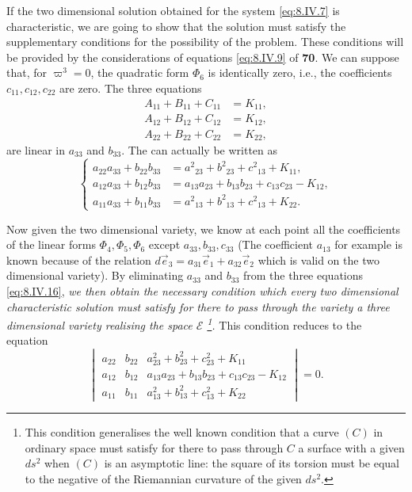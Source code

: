 \documentclass[leqno,11pt]{book}
\numberwithin{equation}{chapter}
\theoremstyle{shape1}
\theoremstyle{shape0}
\theoremstyle{shape2}
\theoremstyle{definition}
\begin{document}
If the two dimensional solution obtained for the system \eqref{eq:8.IV.7} is characteristic, we are going to show that the solution must satisfy the supplementary conditions for the possibility of the problem. These conditions will be provided by the considerations of equations \eqref{eq:8.IV.9} of \textsection\textbf{70}. We can suppose that, for $\varpi^{3}=0$, the quadratic form $\Phi_{6}$ is identically zero, i.e., the coefficients $c_{11},c_{12},c_{22}$ are zero. The three equations
\begin{align*}
  A_{11}+B_{11}+C_{11}&=K_{11},\\
  A_{12}+B_{12}+C_{12}&=K_{12},\\
  A_{22}+B_{22}+C_{22}&=K_{22},
\end{align*}
are linear in $a_{33}$ and $b_{33}$. The can actually be written as
\begin{equation}
  \label{eq:8.IV.16}\tag{IV, 16}
  \left\{
    \begin{aligned}
      a_{22}a_{33}+b_{22}b_{33}&=a^{2}{}_{23}+b^{2}{}_{23}+c^{2}{}_{13}+K_{11},\\
      a_{12}a_{33}+b_{12}b_{33}&=a_{13}a_{23}+b_{13}b_{23}+c_{13}c_{23}-K_{12},\\
      a_{11}a_{33}+b_{11}b_{33}&=a^{2}{}_{13}+b^{2}{}_{13}+c^{2}{}_{13}+K_{22}.
    \end{aligned}
  \right.
\end{equation}

Now given the two dimensional variety, we know at each point all the coefficients of the linear forms $\Phi_{4},\Phi_{5},\Phi_{6}$ except $a_{33},b_{33},c_{33}$ (The coefficient $a_{13}$ for example is known because of the relation $d\vec e_{3}=a_{31}\vec e_{1}+a_{32}\vec e_{2}$ which is valid on the two dimensional variety). By eliminating $a_{33}$ and $b_{33}$ from the three equations \eqref{eq:8.IV.16}, \emph{we then obtain the necessary condition which every two dimensional characteristic solution must satisfy for there to pass through the variety a three dimensional variety realising the space $\mathcal{E}$ \footnote{This condition generalises the well known condition that a curve $(C)$ in ordinary space must satisfy for there to pass through $C$ a surface with a given $ds^{2}$ when $(C)$ is an asymptotic line: the square of its torsion must be equal to the negative of the Riemannian curvature of the given $ds^{2}$.}.} This condition reduces to the equation
\begin{equation}
  \label{eq:8.IV.17}\tag{IV, 17}
  \begin{vmatrix}
    a_{22}&b_{22}&a^{2}_{23}+b^{2}_{23}+c^{2}_{23}+K_{11}\\
    a_{12}&b_{12}&a_{13}a_{23}+b_{13}b_{23}+c_{13}c_{23}-K_{12}\\
    a_{11}&b_{11}&a^{2}_{13}+b^{2}_{13}+c^{2}_{13}+K_{22}
  \end{vmatrix}=0.
\end{equation}
\end{document}
